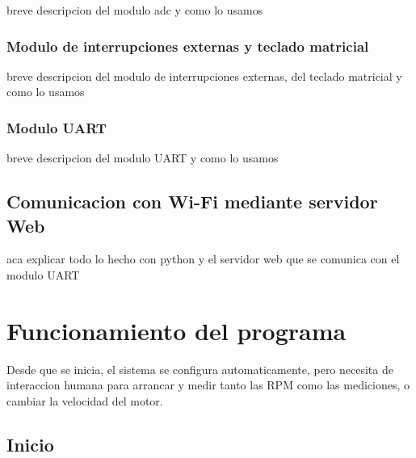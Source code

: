 \documentclass[a4paper]{article}
\begin{document}
breve descripcion del modulo adc y como lo usamos


\subsubsection{Modulo de interrupciones externas y teclado matricial} %
\label{ssub:modulo_de_interrupciones_externas_y_teclado_matricial}

breve descripcion del modulo de interrupciones externas, del teclado matricial y como lo usamos


\subsubsection{Modulo UART} %
\label{ssub:modulo_uart}

breve descripcion del modulo UART y como lo usamos



\subsection{Comunicacion con Wi-Fi mediante servidor Web} %
\label{sub:comunicacion_con_wi_fi_mediante_servidor_web}

aca explicar todo lo hecho con python y el servidor web que se comunica con el modulo UART


\section{Funcionamiento del programa} %
\label{sec:funcionamiento_del_programa}

Desde que se inicia, el sistema se configura automaticamente, pero necesita de interaccion humana para arrancar y medir tanto las RPM como las mediciones, o cambiar la velocidad del motor.

\subsection{Inicio} %
\label{sub:inicio}
\end{document}
